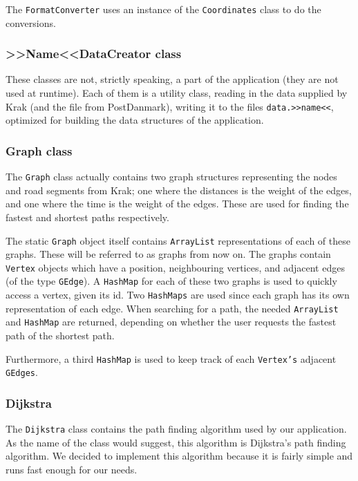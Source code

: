 The \texttt{FormatConverter} uses an instance of the \texttt{Coordinates} class to do the conversions.

\subsubsection{>>Name<<DataCreator class}
These classes are not, strictly speaking, a part of the application (they are not used at runtime). Each of them is a utility class, reading in the data supplied by Krak (and the file from PostDanmark), writing it to the files \texttt{data.>>name<<}, optimized for building the data structures of the application.

\subsubsection{Graph class}
The \texttt{Graph} class actually contains two graph structures representing the nodes and road segments from Krak; one where the distances is the weight of the edges, and one where the time is the weight of the edges. These are used for finding the fastest and shortest paths respectively.
	
The static \texttt{Graph} object itself contains \texttt{ArrayList} representations of each of these graphs. These will be referred to as graphs from now on. The graphs contain \texttt{Vertex} objects which have a position, neighbouring vertices, and adjacent edges (of the type \texttt{GEdge}). A \texttt{HashMap} for each of these two graphs is used to quickly access a vertex, given its id. Two \texttt{HashMaps} are used since each graph has its own representation of each edge. When searching for a path, the needed \texttt{ArrayList} and \texttt{HashMap} are returned, depending on whether the user requests the fastest path of the shortest path.

Furthermore, a third \texttt{HashMap} is used to keep track of each \texttt{Vertex's} adjacent \texttt{GEdges}.

\subsubsection{Dijkstra}
The \texttt{Dijkstra} class contains the path finding algorithm used by our application. As the name of the class would suggest, this algorithm is Dijkstra's path finding algorithm. We decided to implement this algorithm because it is fairly simple and runs fast enough for our needs.
